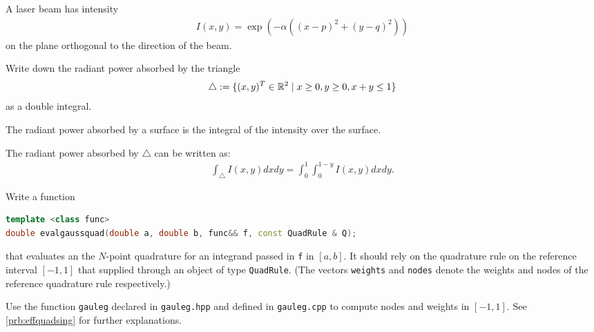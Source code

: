 
\begin{problem}
 
 A laser beam has intensity
 \begin{align*}
  I(x,y) = \exp(- \alpha ((x-p)^2 + (y-q)^2) )
 \end{align*}
 on the plane orthogonal to the direction of the beam.
 
 \begin{subproblem}[1] \label{subprb:nested_quad_1}
  Write down the radiant power absorbed by the triangle
  \begin{align*}
   \bigtriangleup := \{(x,y)^T \in \mathbb{R}^2 \; | \; x \geq 0, y \geq 0, x+y \leq 1 \}
  \end{align*}
  as a double integral.
  
  \begin{hint}
   The  radiant power absorbed by a surface is the integral of the intensity over the surface.
  \end{hint}
  
  \begin{solution}
   The radiant power absorbed by $\bigtriangleup$ can be written as:
   \begin{align*}
    \int_\bigtriangleup I(x,y) dx dy = \int_0^1 \int_0^{1-y} I(x,y) dx dy.
   \end{align*}
  \end{solution}
 \end{subproblem}

 \begin{subproblem}[3] \label{subprb:nested_quad_2}
  Write a \Cpp{} function 
  \begin{lstlisting}[language=c++]
template <class func>
double evalgaussquad(double a, double b, func&& f, const QuadRule & Q);
  \end{lstlisting}
  that evaluates an the $N$-point quadrature for an integrand passed in \texttt{f}
  in $[a,b]$. It should rely on the quadrature rule on the reference interval
  $[-1,1]$ that supplied through an object of type \texttt{QuadRule}. 
  (The vectors \verb|weights| and \verb|nodes| denote the weights and
  nodes of the reference quadrature rule respectively.)
  
  \begin{hint}
   Use the function \verb|gauleg| declared in \verb|gauleg.hpp| 
   and defined in \verb|gauleg.cpp| to compute nodes and weights in $[-1,1]$.
   See \ref{prb:effquadsing} for further explanations. 
  \end{hint}
  

\end{subproblem}
\end{problem}
